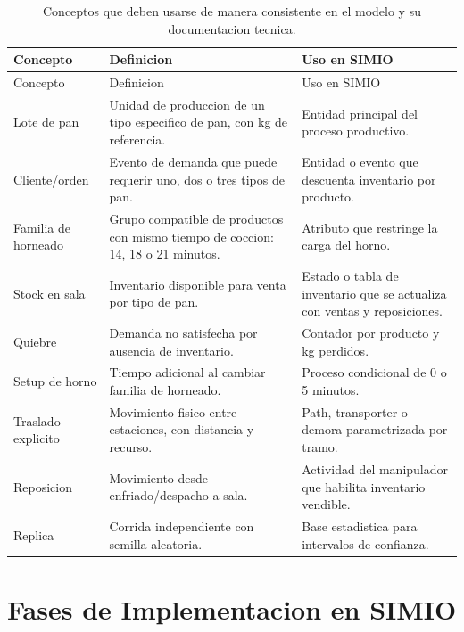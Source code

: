 \documentclass[12pt]{article}
\begin{document}
\begin{longtable}{L{3.2cm}L{5.2cm}L{6.2cm}}
\caption{Conceptos que deben usarse de manera consistente en el modelo y su documentacion tecnica.}\\
\toprule
{}
\color{white}Concepto & \color{white}Definicion & \color{white}Uso en SIMIO \\
\midrule
\endfirsthead
\toprule
{}
\color{white}Concepto & \color{white}Definicion & \color{white}Uso en SIMIO \\
\midrule
\endhead
Lote de pan & Unidad de produccion de un tipo especifico de pan, con kg de referencia. & Entidad principal del proceso productivo. \\
Cliente/orden & Evento de demanda que puede requerir uno, dos o tres tipos de pan. & Entidad o evento que descuenta inventario por producto. \\
Familia de horneado & Grupo compatible de productos con mismo tiempo de coccion: 14, 18 o 21 minutos. & Atributo que restringe la carga del horno. \\
Stock en sala & Inventario disponible para venta por tipo de pan. & Estado o tabla de inventario que se actualiza con ventas y reposiciones. \\
Quiebre & Demanda no satisfecha por ausencia de inventario. & Contador por producto y kg perdidos. \\
Setup de horno & Tiempo adicional al cambiar familia de horneado. & Proceso condicional de 0 o 5 minutos. \\
Traslado explicito & Movimiento fisico entre estaciones, con distancia y recurso. & Path, transporter o demora parametrizada por tramo. \\
Reposicion & Movimiento desde enfriado/despacho a sala. & Actividad del manipulador que habilita inventario vendible. \\
Replica & Corrida independiente con semilla aleatoria. & Base estadistica para intervalos de confianza. \\
\bottomrule
\end{longtable}

\section{Fases de Implementacion en SIMIO}
\end{document}
